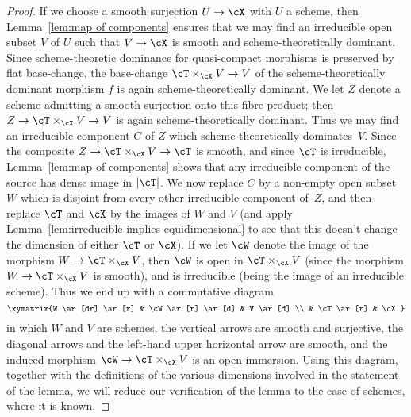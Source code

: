 \begin{proof}
If we choose a smooth surjection $U \to \cX$ with $U$ a scheme,
	then Lemma~\ref{lem:map of components} ensures that
	we may find an irreducible open subset $V$ of $U$ such
	that $V \to \cX$ is smooth and scheme-theoretically dominant.
	Since scheme-theoretic dominance for quasi-compact morphisms
	is preserved by flat base-change,
	the base-change $\cT \times_{\cX} V \to V$ of the scheme-theoretically
	dominant morphism $f$ is again
	scheme-theoretically dominant.   We let $Z$ denote a scheme
	admitting a smooth surjection onto this fibre product;
	then $Z \to \cT \times_{\cX} V \to V$ 
	is again scheme-theoretically dominant.
	Thus we may find an irreducible
	component $C$ of $Z$ which scheme-theoretically
	dominates~$V$.  
	Since the composite  $Z \to \cT\times_{\cX} V \to \cT$ is smooth,
	and since $\cT$ is irreducible,
	Lemma~\ref{lem:map of components} shows that any irreducible
	component of the source has dense image in $|\cT|$. 
	We now replace
	$C$ by a non-empty open subset $W$ which is disjoint from every other
	irreducible component of~$Z$, and 
	then replace $\cT$ and $\cX$ by the images of $W$ 
	and $V$
	(and apply Lemma~\ref{lem:irreducible implies equidimensional}
	to see that this
	doesn't change the dimension of either $\cT$ or $\cX$).
	If we let $\cW$ denote the image of the morphism
	$W \to \cT\times_{\cX} V$, 
	then $\cW$ is open in $\cT\times_{\cX} V$ (since the
	morphism $W \to \cT\times_{\cX} V$ is smooth),
	and is irreducible (being the image of an irreducible
	scheme).  Thus we end up with a commutative diagram
	$$\xymatrix{W \ar[dr] \ar[r]  & \cW \ar[r] \ar[d]
		& V \ar[d] \\ & \cT \ar[r] & \cX}$$
	in which $W$ and $V$ are schemes,
	the vertical arrows are smooth and surjective,
	the diagonal arrows and the left-hand 
        upper horizontal arrow	are smooth, 
	and the induced morphism $\cW \to \cT\times_{\cX} V$ is an
	open immersion.
	Using this diagram, together with the definitions
	of the various dimensions involved in
        the statement of the lemma, we will reduce our verification
	of the lemma to the case of schemes, where it is known.


\end{proof}
